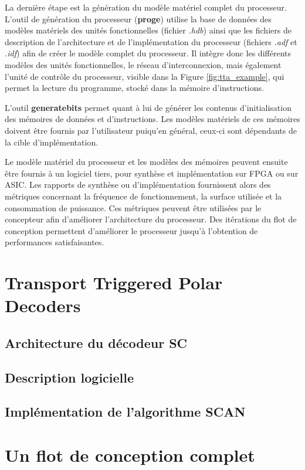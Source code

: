 La dernière étape est la génération du modèle matériel complet du processeur. L'outil de génération du processeur (\textbf{proge}) utilise la base de données des modèles matériels des unités fonctionnelles (fichier \textit{.hdb}) ainsi que les fichiers de description de l'architecture et de l'implémentation du processeur (fichiers \textit{.adf} et \textit{.idf}) afin de créer le modèle complet du processeur. Il intègre donc les différents modèles des unités fonctionnelles, le réseau d'interconnexion, mais également l'unité de contrôle du processeur, visible dans la Figure \ref{fig:tta_example}, qui permet la lecture du programme, stocké dans la mémoire d'instructions.

L'outil \textbf{generatebits} permet quant à lui de générer les contenus d'initialisation des mémoires de données et d'instructions. Les modèles matériels de ces mémoires doivent être fournis par l'utilisateur puiqu'en général, ceux-ci sont dépendants de la cible d'implémentation.

Le modèle matériel du processeur et les modèles des mémoires peuvent ensuite être fournis à un logiciel tiers, pour synthèse et implémentation sur FPGA ou sur ASIC. Les rapports de synthèse ou d'implémentation fournissent alors des métriques concernant la fréquence de fonctionnement, la surface utilisée et la consommation de puissance. Ces métriques peuvent être utilisées par le concepteur afin d'améliorer l'architecture du processeur. Des itérations du flot de conception permettent d'améliorer le processeur jusqu'à l'obtention de performances satisfaisantes.



\section{Transport Triggered Polar Decoders}

\subsection{Architecture du décodeur SC}
\subsection{Description logicielle}
\subsection{Implémentation de l'algorithme SCAN}

\section{Un flot de conception complet}

